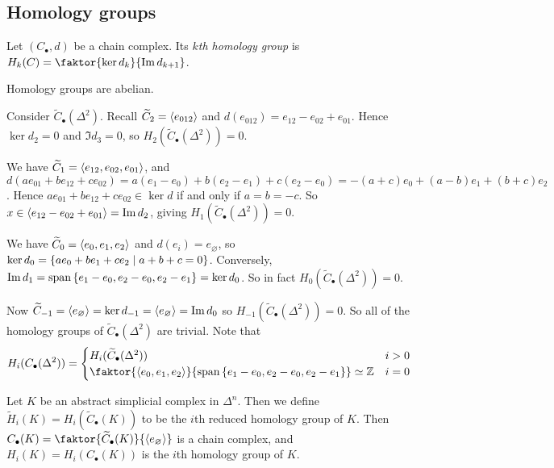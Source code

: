 \subsection{Homology groups}
\begin{definition}
	Let \( (C_\bullet, d) \) be a chain complex.
	Its \emph{\( k \)th homology group} is \( H_k(C) = \faktor{\ker d_k}{\Im d_{k+1}} \).
\end{definition}
\begin{remark}
	Homology groups are abelian.
\end{remark}
\begin{example}
	Consider \( \widetilde C_\bullet(\Delta^2) \).
	Recall \( \widetilde C_2 = \left\langle{} e_{012} \right\rangle \) and \( d(e_{012}) = e_{12} - e_{02} + e_{01} \).
	Hence \( \ker d_2 = 0 \) and \( \Im d_3 = 0 \), so \( H_2(\widetilde C_\bullet(\Delta^2)) = 0 \).

	We have \( \widetilde C_1 = \left\langle{} e_{12}, e_{02}, e_{01} \right\rangle \), and \( d(ae_{01} + be_{12} + ce_{02}) = a(e_1 - e_0) + b(e_2 - e_1) + c(e_2 - e_0) = -(a+c)e_0 + (a-b)e_1 + (b+c)e_2 \).
	Hence \( ae_{01} + be_{12} + ce_{02} \in \ker d \) if and only if \( a = b = -c \).
	So \( x \in \left\langle{} e_{12} - e_{02} + e_{01} \right\rangle = \Im d_2 \), giving \( H_1(\widetilde C_\bullet(\Delta^2)) = 0 \).

	We have \( \widetilde C_0 = \left\langle{} e_0, e_1, e_2 \right\rangle \) and \( d(e_i) = e_\varnothing \), so \( \ker d_0 = \qty{a e_0 + b e_1 + c e_2 \mid a + b + c = 0} \).
	Conversely, \( \Im d_1 = \operatorname{span}\qty{e_1 - e_0, e_2 - e_0, e_2 - e_1} = \ker d_0 \).
	So in fact \( H_0(\widetilde C_\bullet(\Delta^2)) = 0 \).

	Now \( \widetilde C_{-1} = \left\langle{} e_\varnothing \right\rangle = \ker d_{-1} = \left\langle{} e_\varnothing \right\rangle = \Im d_0 \) so \( H_{-1}(\widetilde C_\bullet(\Delta^2)) = 0 \).
	So all of the homology groups of \( \widetilde C_\bullet(\Delta^2) \) are trivial.
	Note that
	\[ H_i(C_\bullet(\Delta^2)) = \begin{cases}
		H_i(\widetilde C_\bullet(\Delta^2)) & i > 0 \\
		\faktor{\genset{e_0, e_1, e_2}}{\vecspan\qty{e_1 - e_0, e_2 - e_0, e_2 - e_1}} \simeq \mathbb Z & i = 0
	\end{cases} \]
\end{example}
\begin{definition}
	Let \( K \) be an abstract simplicial complex in \( \Delta^n \).
	Then we define \( \widetilde H_i(K) = H_i(\widetilde C_\bullet(K)) \) to be the \( i \)th reduced homology group of \( K \).
	Then \( C_\bullet(K) = \faktor{\widetilde C_\bullet(K)}{\genset{e_\varnothing}} \) is a chain complex, and \( H_i(K) = H_i(C_\bullet(K)) \) is the \( i \)th homology group of \( K \).
\end{definition}
